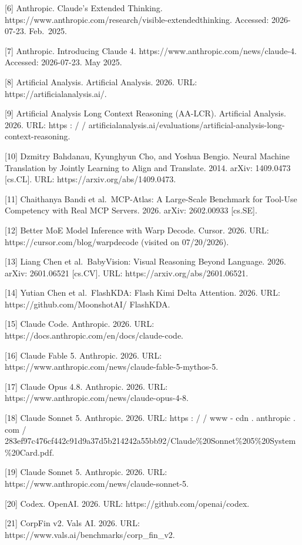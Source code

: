 \documentclass[
  10
]{article}
\begin{document}
{[}6{]} Anthropic. Claude's Extended Thinking.
https://www.anthropic.com/research/visible-extendedthinking. Accessed:
2026-07-23. Feb.~2025.

{[}7{]} Anthropic. Introducing Claude 4.
https://www.anthropic.com/news/claude-4. Accessed: 2026-07-23. May 2025.

{[}8{]} Artificial Analysis. Artificial Analysis. 2026. URL:
https://artificialanalysis.ai/.

{[}9{]} Artificial Analysis Long Context Reasoning (AA-LCR). Artificial
Analysis. 2026. URL: https : / /
artificialanalysis.ai/evaluations/artificial-analysis-long-context-reasoning.

{[}10{]} Dzmitry Bahdanau, Kyunghyun Cho, and Yoshua Bengio. Neural
Machine Translation by Jointly Learning to Align and Translate. 2014.
arXiv: 1409.0473 {[}cs.CL{]}. URL: https://arxiv.org/abs/1409.0473.

{[}11{]} Chaithanya Bandi et al.~MCP-Atlas: A Large-Scale Benchmark for
Tool-Use Competency with Real MCP Servers. 2026. arXiv: 2602.00933
{[}cs.SE{]}.

{[}12{]} Better MoE Model Inference with Warp Decode. Cursor. 2026. URL:
https://cursor.com/blog/warpdecode (visited on 07/20/2026).

{[}13{]} Liang Chen et al.~BabyVision: Visual Reasoning Beyond Language.
2026. arXiv: 2601.06521 {[}cs.CV{]}. URL:
https://arxiv.org/abs/2601.06521.

{[}14{]} Yutian Chen et al.~FlashKDA: Flash Kimi Delta Attention. 2026.
URL: https://github.com/MoonshotAI/ FlashKDA.

{[}15{]} Claude Code. Anthropic. 2026. URL:
https://docs.anthropic.com/en/docs/claude-code.

{[}16{]} Claude Fable 5. Anthropic. 2026. URL:
https://www.anthropic.com/news/claude-fable-5-mythos-5.

{[}17{]} Claude Opus 4.8. Anthropic. 2026. URL:
https://www.anthropic.com/news/claude-opus-4-8.

{[}18{]} Claude Sonnet 5. Anthropic. 2026. URL: https : / / www - cdn .
anthropic . com /
283ef97c476cf442c91d9a37d5b214242a55bb92/Claude\%20Sonnet\%205\%20System\%20Card.pdf.

{[}19{]} Claude Sonnet 5. Anthropic. 2026. URL:
https://www.anthropic.com/news/claude-sonnet-5.

{[}20{]} Codex. OpenAI. 2026. URL: https://github.com/openai/codex.

{[}21{]} CorpFin v2. Vals AI. 2026. URL:
https://www.vals.ai/benchmarks/corp\_fin\_v2.
\end{document}
